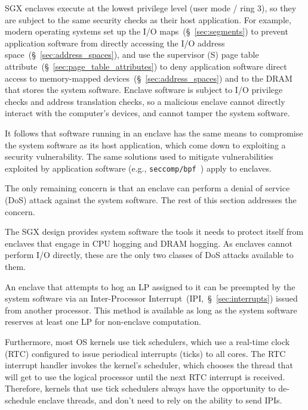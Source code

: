 \label{sec:sgx_enclaves_vs_system}

SGX enclaves execute at the lowest privilege level (user mode / ring 3), so
they are subject to the same security checks as their host application. For
example, modern operating systems set up the I/O maps~(\S~\ref{sec:segments})
to prevent application software from directly accessing the I/O address
space~(\S~\ref{sec:address_spaces}), and use the supervisor (S) page table
attribute~(\S~\ref{sec:page_table_attributes}) to deny application software
direct access to memory-mapped devices~(\S~\ref{sec:address_spaces}) and to the
DRAM that stores the system software. Enclave software is subject to I/O
privilege checks and address translation checks, so a malicious enclave cannot
directly interact with the computer's devices, and cannot tamper the system
software.

It follows that software running in an enclave has the same means to compromise
the system software as its host application, which come down to exploiting a
security vulnerability. The same solutions used to mitigate vulnerabilities
exploited by application software (e.g.,
\texttt{seccomp/bpf}~\cite{kim2013seccompbpf}) apply to enclaves.

The only remaining concern is that an enclave can perform a denial of service
(DoS) attack against the system software. The rest of this section addresses
the concern.

The SGX design provides system software the tools it needs to protect itself
from enclaves that engage in CPU hogging and DRAM hogging. As enclaves cannot
perform I/O directly, these are the only two classes of DoS attacks available
to them.

An enclave that attempts to hog an LP assigned to it can be preempted by the
system software via an Inter-Processor Interrupt~(IPI,~\S~\ref{sec:interrupts})
issued from another processor. This method is available as long as the system
software reserves at least one LP for non-enclave computation.

Furthermore, most OS kernels use tick schedulers, which use a real-time clock
(RTC) configured to issue periodical interrupts (ticks) to all cores. The RTC
interrupt handler invokes the kernel's scheduler, which chooses the thread that
will get to use the logical processor until the next RTC interrupt is received.
Therefore, kernels that use tick schedulers always have the opportunity to
de-schedule enclave threads, and don't need to rely on the ability to send
IPIs.

